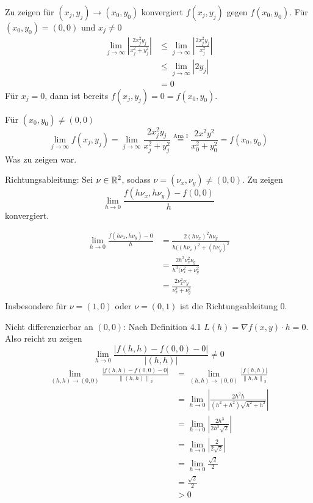 \documentclass[sectionformat=aufgabe]{gadsescript}
\begin{document}
Zu zeigen für $ (x_j, y_j) \to (x_0, y_0) $ konvergiert $ f(x_j, y_j)  $ gegen $ f(x_0, y_0) $.
Für $ (x_0, y_0) = (0, 0) $ und $ x_j \neq 0 $
\begin{align*}
	\lim_{j \to \infty} \left| \frac{ 2 x_j^2 y_j }{ x_j^2 + y_j^2 }  \right|
	&\leq \lim_{j \to \infty} \left| \frac{ 2 x_j^2 y_j }{ x_j^2 }  \right|  \\
	&\leq \lim_{j \to \infty} \left| 2 y_j \right| \\
	&= 0
\end{align*}
Für $ x_j = 0 $, dann ist bereits $ f(x_j, y_j) = 0 = f(x_0, y_0) $.

Für $ (x_0, y_0) \neq (0, 0) $ 
\[
	\lim_{j \to \infty} f(x_j, y_j) = \lim_{j \to \infty} \frac{ 2 x_j^2 y_j }{ x_j^2 + y_j^2 } \overset{\text{Ana I} }{=} \frac{2 x^2 y^2 }{ x_0^2 + y_0^2 } = f(x_0, y_0)
\]
Was zu zeigen war.

Richtungsableitung:
Sei $ \nu \in \mathbb{R} ^2 $, sodass $ \nu = (\nu_x, \nu_y) \neq (0, 0) $. Zu zeigen
\[
	\lim_{h \to 0} \frac{ f(h\nu_x, h\nu_y) - f(0, 0) }{ h } 
\]
konvergiert.

\begin{align*}
	\lim_{h \to 0}  \frac{f(h\nu_x, h\nu_y) - 0 }{ h } &= \frac{2(h\nu_x)^2 h\nu_y}{ h ((h \nu_x)^2 + (h \nu_y)^2 } \\
	&= \frac{2h^3\nu_x^2\nu_y}{ h^3(\nu_x^2 + \nu_y^2 }  \\
	&= \frac{2\nu_x^2\nu_y}{ \nu_x^2 + \nu_y^2 }  \\
\end{align*}
Insbesondere für $ \nu = (1, 0) $ oder $ \nu = (0, 1) $ ist die Richtungsableitung $ 0 $.

Nicht differenzierbar an $ (0, 0) $: Nach Definition 4.1
$ L(h) = \nabla f(x, y) \cdot h = 0 $.
Also reicht zu zeigen
\[
	\lim_{h \to 0} \frac{ \left| f(h, h) - f(0, 0) - 0 \right|}{ \left| (h, h) \right|  } \neq 0
\]
\begin{align*}
	\lim_{(h, h) \to (0, 0)} \frac{ \left| f(h, h) - f(0, 0) - 0 \right|}{ \left\| (h, h) \right\|_2  } &= \lim_{(h, h) \to (0, 0)} \frac{\left| f(h, h) \right| }{ \left\| h, h \right\|_2  }  \\
	&= \lim_{h \to 0}  \left| \frac{ 2h^2h }{ (h^2 + h^2)\sqrt{h^2 + h^2}  } \right| \\
	&= \lim_{h \to 0} \left| \frac{ 2h^3 }{ 2h^3\sqrt{2}  } \right| \\
	&= \lim_{h \to 0} \left| \frac{ 2 }{ 2\sqrt{2}  } \right| \\
	&= \lim_{h \to 0} \frac{ \sqrt{2}  }{ 2 } \\
	&= \frac{ \sqrt{2}  }{ 2 } \\
	&> 0
\end{align*}
\end{document}
